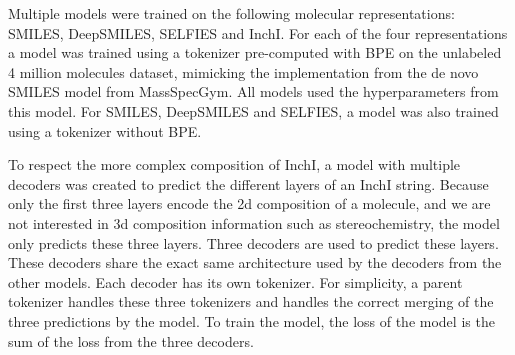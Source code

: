 Multiple models were trained on the following molecular representations: SMILES, DeepSMILES, SELFIES and InchI.
For each of the four representations a model was trained using a tokenizer pre-computed with \ac{BPE} on the unlabeled 4 million molecules dataset,
mimicking the implementation from the de novo SMILES model from MassSpecGym. All models used the hyperparameters from this model.
For SMILES, DeepSMILES and SELFIES, a model was also trained using a tokenizer without \ac{BPE}.

To respect the more complex composition of InchI, a model with multiple decoders was created to predict the different layers of an InchI string.
Because only the first three layers encode the 2d composition of a molecule, and we are not interested in 3d composition information such as stereochemistry,
the model only predicts these three layers.
Three decoders are used to predict these layers. These decoders share the exact same architecture used by the decoders from the other models.
Each decoder has its own tokenizer. For simplicity, a parent tokenizer handles these three tokenizers and handles the correct merging of the three predictions by the model.
To train the model, the loss of the model is the sum of the loss from the three decoders.
